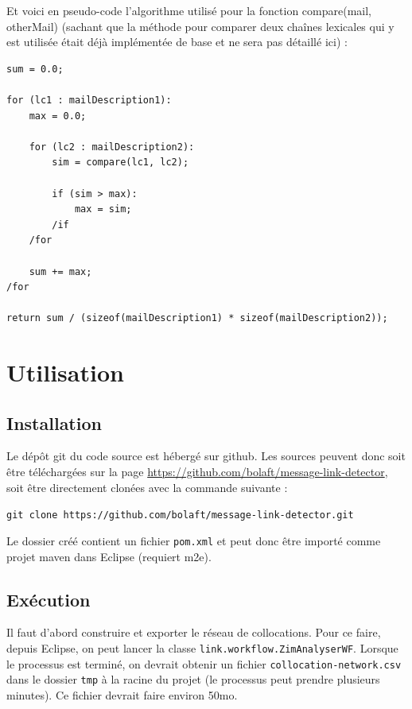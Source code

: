 \documentclass[a4paper]{article}
\begin{document}
Et voici en pseudo-code l'algorithme utilisé pour la fonction compare(mail, otherMail) (sachant que la méthode pour comparer deux chaînes lexicales qui y est utilisée était déjà implémentée de base et ne sera pas détaillé ici) :

\begin{lstlisting}
sum = 0.0;

for (lc1 : mailDescription1):
	max = 0.0;
	
	for (lc2 : mailDescription2):
		sim = compare(lc1, lc2);
		
		if (sim > max):
			max = sim;
		/if
	/for
	
	sum += max;
/for

return sum / (sizeof(mailDescription1) * sizeof(mailDescription2));
\end{lstlisting}

\section{Utilisation}

\subsection{Installation}

Le dépôt git du code source est hébergé sur github. Les sources peuvent donc soit être téléchargées sur la page \url{https://github.com/bolaft/message-link-detector}, soit être directement clonées avec la commande suivante :\newline

\texttt{git clone https://github.com/bolaft/message-link-detector.git}\newline

Le dossier créé contient un fichier \texttt{pom.xml} et peut donc être importé comme projet maven dans Eclipse (requiert m2e).

\subsection{Exécution}

Il faut d'abord construire et exporter le réseau de collocations. Pour ce faire, depuis Eclipse, on peut lancer la classe \texttt{link.workflow.ZimAnalyserWF}. Lorsque le processus est terminé, on devrait obtenir un fichier \texttt{collocation-network.csv} dans le dossier \texttt{tmp} à la racine du projet (le processus peut prendre plusieurs minutes). Ce fichier devrait faire environ 50mo.\newline
\end{document}
